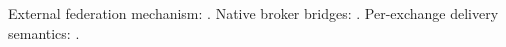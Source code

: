 \documentclass{article}
\begin{document}
External federation mechanism: \cite{ribas2022federation}.
Native broker bridges: \cite{mosquittoBridges}.
Per-exchange delivery semantics: \cite{oasis2014mqtt}.


\end{document}
